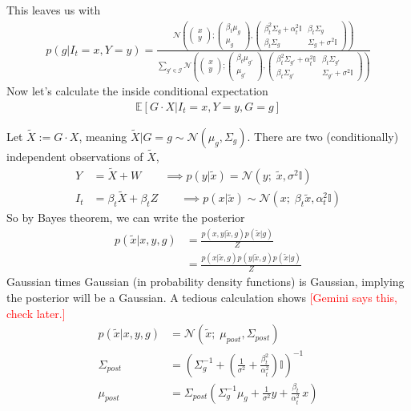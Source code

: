 \documentclass[12pt,fleqn]{article}
\numberwithin{equation}{section}
\begin{document}
This leaves us with
\begin{align}
	p(g | I_t = x, Y=y) = \frac{\mathcal N \left(\begin{pmatrix}
		x \\ y
	\end{pmatrix};\begin{pmatrix}
			\beta_t \mu_g \\ \mu_g
		\end{pmatrix}, \begin{pmatrix}
			\beta_t^2 \Sigma_g + \alpha_t^2 \mathbb I & \beta_t \Sigma_g \\ \beta_t \Sigma_g & \Sigma_g + \sigma^2 \mathbb I
		\end{pmatrix} \right) }{\sum_{g' \in \mathcal G}\mathcal N\left( \begin{pmatrix}
		x \\ y
	\end{pmatrix};\begin{pmatrix}
			\beta_t \mu_{g'} \\ \mu_{g'}
		\end{pmatrix}, \begin{pmatrix}
			\beta_t^2 \Sigma_{g'} + \alpha_t^2 \mathbb I & \beta_t \Sigma_{g'} \\ \beta_t \Sigma_{g'} & \Sigma_{g'} + \sigma^2 \mathbb I
		\end{pmatrix} \right)}
\end{align}
Now let's calculate the inside conditional expectation
\begin{align}
	\mathbb E[G\cdot X | I_t= x, Y=y, G=g] 
\end{align}
\begin{sidework}
	Let $\tilde X := G \cdot X$, meaning $\tilde X | G=g \sim \mathcal N(\mu_g, \Sigma_g)$. There are two (conditionally) independent observations of $\tilde X$,
\begin{align}
	Y & = \tilde X + W \qquad  \implies p(y |\tilde x) =  \mathcal N(y; \; \tilde x , \sigma^2 \mathbb I)\\
	I_t & = \beta_t \tilde X + \beta_t Z  \qquad \implies p(x | \tilde x) \sim \mathcal N(x; \; \beta_t \tilde x, \alpha_t^2 \mathbb I)
\end{align}
So by Bayes theorem, we can write the posterior
\begin{align}
	p(\tilde x | x , y ,g) & = \frac{p(x,y | \tilde x ,g) p(\tilde x|g)}{Z}\\
	& = \frac{p(x|\tilde x ,g) p(y | \tilde x,g) p(\tilde x|g)}{Z}
\end{align}
Gaussian times Gaussian (in probability density functions) is Gaussian, implying the posterior will be a Gaussian. A tedious calculation shows \textcolor{red}{[Gemini says this, check later.]}
\begin{align}
	p(\tilde x | x,y,g) & = \mathcal N(\tilde x ; \; \mu_{post}, \Sigma_{post}) \\
	\Sigma_{post} & = \left( \Sigma_g^{-1} + \left(\tfrac{1}{\sigma^2} + \tfrac{\beta_t^2}{\alpha_t^2}  \right) \mathbb I\right)^{-1}\\
	\mu_{post} & = \Sigma_{post} \left( \Sigma_g^{-1} \mu_g + \tfrac{1}{\sigma^2} y + \tfrac{\beta_t}{\alpha_t^2} \, x \right)
\end{align} 
\end{sidework}
\end{document}
